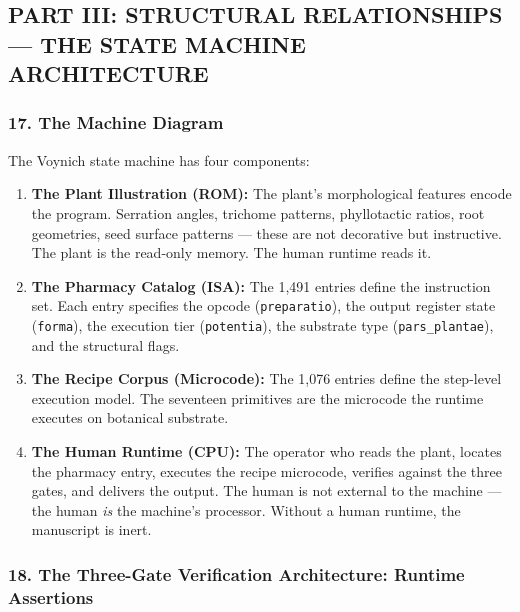 \documentclass[12pt,a4paper]{article}
\begin{document}
\hypertarget{part-iii-structural-relationships-the-state-machine-architecture}{%
\subsection{PART III: STRUCTURAL RELATIONSHIPS --- THE STATE MACHINE
ARCHITECTURE}\label{part-iii-structural-relationships-the-state-machine-architecture}}

\hypertarget{the-machine-diagram}{%
\subsubsection{17. The Machine Diagram}\label{the-machine-diagram}}

The Voynich state machine has four components:

\begin{enumerate}
\def\labelenumi{\arabic{enumi}.}
\item
  \textbf{The Plant Illustration (ROM):} The plant's morphological
  features encode the program. Serration angles, trichome patterns,
  phyllotactic ratios, root geometries, seed surface patterns --- these
  are not decorative but instructive. The plant is the read-only memory.
  The human runtime reads it.
\item
  \textbf{The Pharmacy Catalog (ISA):} The 1,491 entries define the
  instruction set. Each entry specifies the opcode
  (\texttt{preparatio}), the output register state (\texttt{forma}), the
  execution tier (\texttt{potentia}), the substrate type
  (\texttt{pars\_plantae}), and the structural flags.
\item
  \textbf{The Recipe Corpus (Microcode):} The 1,076 entries define the
  step-level execution model. The seventeen primitives are the microcode
  the runtime executes on botanical substrate.
\item
  \textbf{The Human Runtime (CPU):} The operator who reads the plant,
  locates the pharmacy entry, executes the recipe microcode, verifies
  against the three gates, and delivers the output. The human is not
  external to the machine --- the human \emph{is} the machine's
  processor. Without a human runtime, the manuscript is inert.
\end{enumerate}

\hypertarget{the-three-gate-verification-architecture-runtime-assertions}{%
\subsubsection{18. The Three-Gate Verification Architecture: Runtime
Assertions}\label{the-three-gate-verification-architecture-runtime-assertions}}
\end{document}
